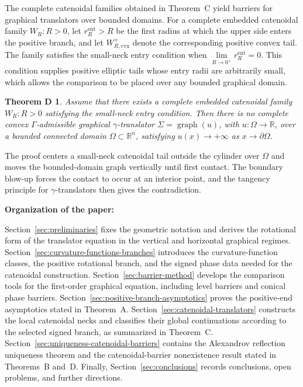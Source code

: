 \documentclass{amsart}
\newcommand{\calcheading}[1]{%
    \medskip\noindent\textbf{#1}\par\nobreak\smallskip%
}
\theoremstyle{plain}
\theoremstyle{mainintrothm}
\newtheorem{maintheoremd}{Theorem D}
\theoremstyle{definition}
\begin{document}
The complete catenoidal families obtained in Theorem~C yield barriers for
graphical translators over bounded domains.  For a complete embedded
catenoidal family ${W_R:R>0}$, let $r_R^{\mathrm{ent}}>R$ be the first radius
at which the upper side enters the positive branch, and let
$W_{R,\mathrm{cvx}}^+$ denote the corresponding positive convex tail.  The
family satisfies the small-neck entry condition when $\lim\limits_{R\to0^+} r_R^{\mathrm{ent}}=0$. This condition supplies positive elliptic tails whose entry radii are arbitrarily small, which allows the comparison to be placed over any bounded graphical domain.

\medskip

\begin{maintheoremd}
	Assume that there exists a complete embedded catenoidal family
	${W_R:R>0}$ satisfying the small-neck entry condition.  Then there is no
	complete convex $\Gamma$-admissible graphical $\gamma$-translator
	$\Sigma=\operatorname{graph}(u)$, with $u:\Omega\to\mathbb R$, over a
	bounded connected domain $\Omega\subset\mathbb R^n$, satisfying $u(x)\to+\infty$ as $x\to\partial\Omega$.
\end{maintheoremd}

\medskip

The proof centers a small-neck catenoidal tail outside the cylinder over
$\Omega$ and moves the bounded-domain graph vertically until first contact.  The
boundary blow-up forces the contact to occur at an interior point, and the
tangency principle for $\gamma$-translators then gives the contradiction.

\calcheading{Organization of the paper:}
Section~\ref{sec:preliminaries} fixes the geometric notation and derives the
rotational form of the translator equation in the vertical and horizontal
graphical regimes.  Section~\ref{sec:curvature-functions-branches} introduces
the curvature-function classes, the positive rotational branch, and the signed
phase data needed for the catenoidal construction.  Section~\ref{sec:barrier-method}
develops the comparison tools for the first-order graphical equation, including
level barriers and conical phase barriers.  Section~\ref{sec:positive-branch-asymptotics}
proves the positive-end asymptotics stated in Theorem~A.
Section~\ref{sec:catenoidal-translators} constructs the local catenoidal necks
and classifies their global continuations according to the selected signed
branch, as summarized in Theorem~C.
Section~\ref{sec:uniqueness-catenoidal-barriers} contains the Alexandrov
reflection uniqueness theorem and the catenoidal-barrier nonexistence result
stated in Theorems~B and~D.  Finally, Section~\ref{sec:conclusions} records
conclusions, open problems, and further directions.
\end{document}
